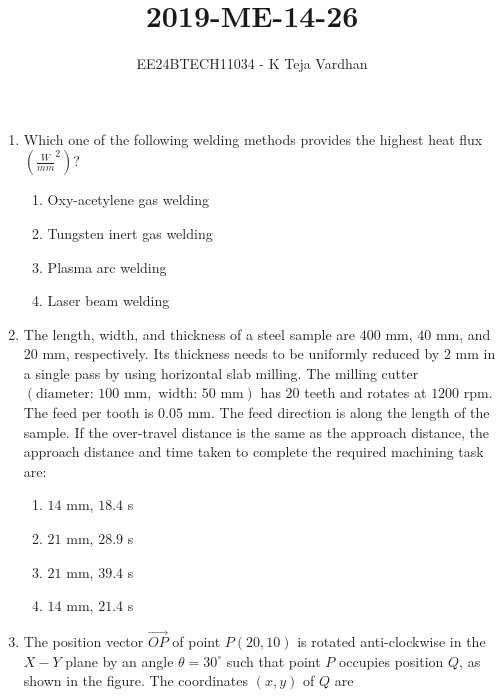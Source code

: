 \documentclass{article}
\newcommand{\brak}[1]{\left( #1 \right)}
\begin{document}

\title{2019-ME-14-26}
\author{EE24BTECH11034 - K Teja Vardhan}
{\let\newpage\relax\maketitle}

\begin{enumerate}

\item Which one of the following welding methods provides the highest heat flux $\brak{\frac{W}{mm}^2}$?

\begin{enumerate}
    \item Oxy-acetylene gas welding
    \item Tungsten inert gas welding
    \item Plasma arc welding
    \item Laser beam welding
\end{enumerate}

\item The length, width, and thickness of a steel sample are $400$ mm, $40$ mm, and $20$ mm, respectively. Its thickness needs to be uniformly reduced by $2$ mm in a single pass by using horizontal slab milling. The milling cutter $\brak{\text{diameter: } 100 \text{ mm}, \text{ width: } 50 \text{ mm}}$ has $20$ teeth and rotates at $1200$ rpm. The feed per tooth is $0.05$ mm. The feed direction is along the length of the sample. If the over-travel distance is the same as the approach distance, the approach distance and time taken to complete the required machining task are:

\begin{enumerate}
    \item $14$ mm, $18.4$ s
    \item $21$ mm, $28.9$ s
    \item $21$ mm, $39.4$ s
    \item $14$ mm, $21.4$ s
\end{enumerate}

\item The position vector $\overrightarrow{OP}$ of point $P \brak{20, 10}$ is rotated anti-clockwise in the $X-Y$ plane by an angle $\theta = 30^\circ$ such that point $P$ occupies position $Q$, as shown in the figure. The coordinates $\brak{x, y}$ of $Q$ are

\begin{center}
\end{center}


\end{enumerate}
\end{document}
